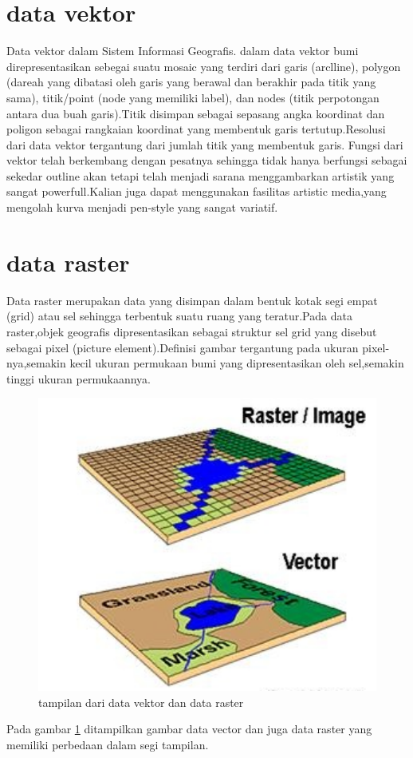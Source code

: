 


\section{data vektor}
  Data vektor dalam Sistem Informasi Geografis. dalam  data vektor bumi direpresentasikan sebegai suatu  mosaic yang terdiri dari garis (arclline), polygon (dareah yang dibatasi oleh garis yang berawal dan berakhir pada titik yang sama), titik/point (node yang memiliki label),  dan nodes (titik perpotongan antara dua buah garis).Titik disimpan sebagai sepasang angka koordinat dan poligon sebagai rangkaian koordinat yang membentuk garis tertutup.Resolusi dari data vektor tergantung dari jumlah titik yang membentuk garis.
  Fungsi dari vektor telah berkembang dengan pesatnya sehingga tidak hanya berfungsi sebagai sekedar outline akan tetapi telah menjadi sarana menggambarkan artistik yang sangat powerfull.Kalian juga dapat menggunakan fasilitas artistic media,yang mengolah kurva menjadi pen-style yang sangat variatif.

  
 \section{data raster}
 Data raster merupakan data yang disimpan dalam bentuk kotak segi empat (grid)
atau sel sehingga terbentuk suatu ruang yang teratur.Pada data raster,objek geografis dipresentasikan sebagai struktur sel grid yang disebut sebagai pixel (picture element).Definisi gambar tergantung pada ukuran pixel-nya,semakin kecil ukuran permukaan bumi yang dipresentasikan oleh sel,semakin tinggi ukuran permukaannya.

\begin{figure}[ht]
\centerline{\includegraphics[width=1\textwidth] {figures/vektor01.JPG}}
\caption{tampilan dari data vektor dan data raster}
\label{vektor01}
\end{figure}
Pada gambar \ref{vektor01} ditampilkan gambar data vector dan juga data raster yang memiliki perbedaan dalam segi tampilan.

